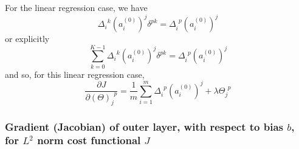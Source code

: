 \documentclass[10pt]{amsart}
\begin{document}
\begin{multicols*}{2}
For the linear regression case, we have
\[
\Delta_i^{\  \  k} (a_i^{(0)})^j \delta^{pk} = \Delta_i^{\  \  p} (a_i^{(0)})^j 
\]
or explicitly 
\[
\sum_{k=0}^{K-1} \Delta_i^{\  \  k} (a_i^{(0)})^j \delta^{pk} = \Delta_i^{\  \  p} (a_i^{(0)})^j
\]
and so, for this linear regression case,  
\begin{equation}
\frac{ \partial J}{ \partial ( \Theta)_j^{\  \  p}} = \frac{1}{m} \sum_{i=1}^m \Delta_i^{\  \  p} (a_i^{(0)})^j + \lambda \Theta_j^{\  \  p}
\end{equation}

\subsubsection{Gradient (Jacobian) of outer layer, with respect to bias $b$, for $L^2$ norm cost functional $J$}


\end{multicols*}
\end{document}
